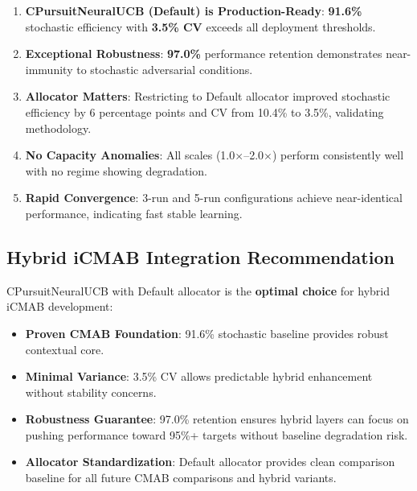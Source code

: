 \documentclass[12pt,a4paper]{article}
\newcommand{\primarytext}[1]{\textcolor{primaryblue}{\textbf{#1}}}
\newcommand{\success}[1]{\textcolor{accentgreen}{\textbf{#1}}}
\begin{document}
\begin{enumerate}
    \item \primarytext{CPursuitNeuralUCB (Default) is Production-Ready}: \success{91.6\%} stochastic efficiency with \success{3.5\% CV} exceeds all deployment thresholds.
    
    \item \success{Exceptional Robustness}: \success{97.0\%} performance retention demonstrates near-immunity to stochastic adversarial conditions.
    
    \item \success{Allocator Matters}: Restricting to Default allocator improved stochastic efficiency by 6 percentage points and CV from 10.4\% to 3.5\%, validating methodology.
    
    \item \success{No Capacity Anomalies}: All scales (1.0$\times$--2.0$\times$) perform consistently well with no regime showing degradation.
    
    \item \success{Rapid Convergence}: 3-run and 5-run configurations achieve near-identical performance, indicating fast stable learning.
\end{enumerate}

\subsection{Hybrid iCMAB Integration Recommendation}

CPursuitNeuralUCB with Default allocator is the \textbf{optimal choice} for hybrid iCMAB development:

\begin{itemize}
    \item \success{Proven CMAB Foundation}: 91.6\% stochastic baseline provides robust contextual core.
    
    \item \success{Minimal Variance}: 3.5\% CV allows predictable hybrid enhancement without stability concerns.
    
    \item \success{Robustness Guarantee}: 97.0\% retention ensures hybrid layers can focus on pushing performance toward 95\%+ targets without baseline degradation risk.
    
    \item \success{Allocator Standardization}: Default allocator provides clean comparison baseline for all future CMAB comparisons and hybrid variants.
\end{itemize}
\end{document}

